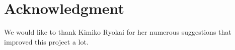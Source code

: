 \section{Acknowledgment}\label{sec:ack}
We would like to thank Kimiko Ryokai for her numerous suggestions that improved this project a lot.
